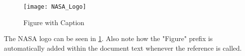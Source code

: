 \begin{figure}[H]
   \centering
   \texttt{[image: NASA\_Logo]}
   \caption{Figure with Caption} 
   \label{fig:nasa-logo}
\end{figure}

The NASA logo can be seen in \ref{fig:nasa-logo}.
Also note how the "Figure" prefix is automatically added within the document text whenever the reference is called.